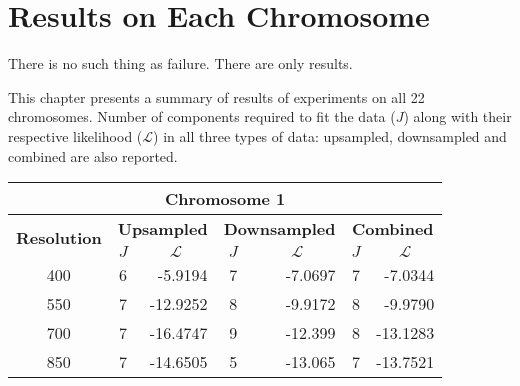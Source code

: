 \chapter{Results on Each Chromosome}
\label{ap:appendRslt}



\begin{fquote}There is no such thing as failure. There are only results.  \end{fquote} 

\begin{synopsis}
This chapter presents a summary of results of experiments on all 22 chromosomes. Number of components required to fit the data ($J$) along with their respective likelihood ($\mathcal{L}$) in all three types of data: upsampled, downsampled and combined are also reported.
\end{synopsis}

\begin{table}[h!]
  \centering
\begin{tabular}{|c|c|r|c|r|c|r|}\hline
\multicolumn{7}{|c|}{\textbf{Chromosome 1}} \\ \hline
\multirow{2}{*}{\textbf{Resolution}} & \multicolumn{2}{|c|}{\textbf{Upsampled}} &  \multicolumn{2}{|c|}{\textbf{Downsampled}} &  \multicolumn{2}{|c|}{\textbf{Combined}} \\ \cline{2-7}
    & $J$ & \multicolumn{1}{|c|}{\textbf{$\mathcal{L}$}} & $J$ & \multicolumn{1}{|c|}{\textbf{$\mathcal{L}$}} & $J$ & \multicolumn{1}{|c|}{\textbf{$\mathcal{L}$}}   \\ \hline
400 & 6 & -5.9194 & 7 & -7.0697 & 7 & -7.0344  \\ \hline
550 & 7 & -12.9252 & 8 & -9.9172 & 8 & -9.9790  \\ \hline
700 & 7 & -16.4747 & 9 & -12.399 & 8 & -13.1283  \\ \hline
850 & 7 & -14.6505& 5 & -13.065 & 7 & -13.7521  \\ \hline
\end{tabular}
\end{table}

\clearpage

